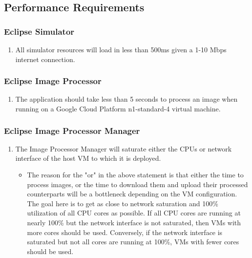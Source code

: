 \documentclass[10pt, onecolumn, draftclsnofoot, letterpaper, compsoc]{IEEEtran}
\begin{document}
\subsection{Performance Requirements}

\subsubsection{Eclipse Simulator}
	\begin{enumerate}
		\item All simulator resources will load in less than 500ms given a 1-10
		 Mbps internet connection.
	\end{enumerate}

\subsubsection{Eclipse Image Processor}
	\begin{enumerate}
		\item The application should take less than 5 seconds to process an
		 image when running on a Google Cloud Platform n1-standard-4 virtual
		 machine.
	\end{enumerate}

\subsubsection{Eclipse Image Processor Manager}
	\begin{enumerate}
		\item The Image Processor Manager will saturate either the CPUs or network interface of
		the host VM to which it is deployed.
		\begin{itemize}
			\item The reason for the "or" in the above statement is that either the time to process
			images, or the time to download them and upload their processed counterparts will be a
			bottleneck depending on the VM configuration. The goal here is to get as close to network
			saturation and 100\% utilization of all CPU cores as possible. If all CPU cores are running
			at nearly 100\% but the network interface is not saturated, then VMs with more cores should
			be used. Conversely, if the network interface is saturated but not all cores are running at
			100\%, VMs with fewer cores should be used.
		\end{itemize}
	\end{enumerate}
\end{document}
